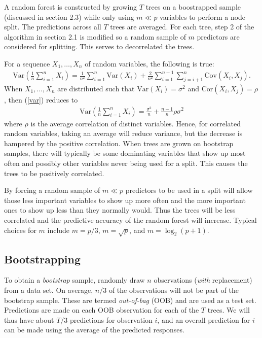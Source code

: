 A random forest is constructed by growing $T$ trees on a boostrapped sample (discussed in section 2.3) while only using $m\ll p$ variables to perform a node split. The predictions across all $T$ trees are averaged. For each tree, step 2 of the algorithm in section 2.1 is modified so a random sample of $m$ predictors are considered for splitting. This serves to decorrelated the trees.

For a sequence $X_1,\ldots,X_n$ of random variables, the following is true:
\begin{eqnarray}
\mathrm{Var}\left(\frac{1}{n}\sum_{i=1}^nX_i\right) = \frac{1}{n^2}\sum_{i=1}^n\mathrm{Var}(X_i) + \frac{2}{n^2}\sum_{i=1}^{n-1}\sum_{j=i+1}^n\mathrm{Cov}(X_i,X_j).
\label{var}
\end{eqnarray}
When $X_1,\ldots,X_n$ are distributed such that $\mathrm{Var}(X_i)=\sigma^2$ and $\mathrm{Cor}(X_i, X_j)=\rho$, then (\ref{var}) reduces to
\begin{eqnarray}
\mathrm{Var}\left(\frac{1}{n}\sum_{i=1}^nX_i\right) = \frac{\sigma^2}{n} + \frac{n-1}{n}\rho\sigma^2
\end{eqnarray}
where $\rho$ is the average correlation of distinct variables. Hence, for correlated random variables, taking an average will reduce variance, but the decrease is hampered by the positive correlation. When trees are grown on bootstrap samples, there will typically be some dominating variables that show up most often and possibly other variables never being used for a split. This causes the trees to be positively correlated.

By forcing a random sample of $m\ll p$ predictors to be used in a split will allow those less important variables to show up more often and the more important ones to show up less than they normally would. Thus the trees will be less correlated and the predictive accuracy of the random forest will increase. Typical choices for $m$ include $m=p/3$, $m=\sqrt{p}$, and $m=\log_2(p + 1)$.

\subsection{Bootstrapping}

To obtain a \emph{bootstrap} sample, randomly draw $n$ observations (\emph{with} replacement) from a data set. On average, $n/3$ of the observations will not be part of the bootstrap sample. These are termed \emph{out-of-bag} (OOB) and are used as a test set. Predictions are made on each OOB observation for each of the $T$ trees. We will thus have about $T/3$ predictions for observation $i$, and an overall prediction for $i$ can be made using the average of the predicted responses.


